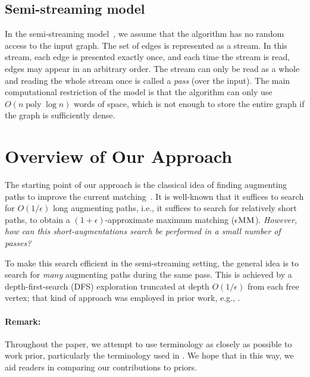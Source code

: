 \documentclass{article}
\newcommand{\eps}{\epsilon}
\DeclareMathOperator{\poly}{poly}
\newcommand{\eMM}{\eps\textsc{MM}}
\begin{document}
\subsection{Semi-streaming model}
In the semi-streaming model~\cite{FeigenbaumKMSZ05}, we assume that the algorithm has no random access to the input graph.
The set of edges is represented as a stream.
In this stream, each edge is presented exactly once, and each time the stream is read, edges may appear in an arbitrary order.
The stream can only be read as a whole and reading the whole stream once is called a \emph{pass} (over the input).
The main computational restriction of the model is that the algorithm can only use $O(n \poly \log n)$ words of space, which is not enough to store the entire graph if the graph is sufficiently dense.



\section{Overview of Our Approach}\label{sec:overview}
The starting point of our approach is the classical idea of finding augmenting paths to improve the current matching~\cite{berge1957two,edmonds1965paths,hopcroft1971n5}.
It is well-known that it suffices to search for $O(1/\eps)$ long augmenting paths, i.e., it suffices to search for relatively short paths, to obtain a $(1+\eps)$-approximate maximum matching ($\eMM$). \emph{However, how can this short-augmentations search be performed in a small number of passes?}

To make this search efficient in the semi-streaming setting, the general idea is to search for \emph{many} augmenting paths during the same pass. This is achieved by a depth-first-search (DFS) exploration truncated at depth $O(1/\eps)$ from each free vertex; that kind of approach was employed in prior work, e.g., \cite{mcgregor2005finding,eggert2012bipartite,tirodkar2018deterministic,FMU22}.



\paragraph{Remark:} Throughout the paper, we attempt to use terminology as closely as possible to work prior, particularly the terminology used in \cite{FMU22}. 
We hope that in this way, we aid readers in comparing our contributions to priors.
\end{document}
